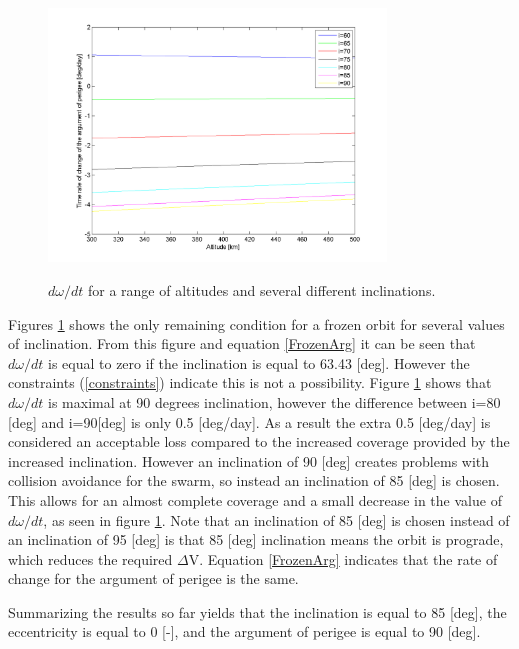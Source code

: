 \begin{figure}
\centering
\includegraphics[width=0.8\textwidth, angle=0]{chapters/img/AltVsOmdot.png}
\label{fig:AltVsOmdot}
\caption{$d\omega/dt$ for a range of altitudes and several different inclinations.}
\end{figure}

Figures \ref{fig:AltVsOmdot} shows the only remaining condition for a frozen orbit for several values of inclination. From this figure and equation \ref{FrozenArg} it can be seen that $d\omega/dt$ is equal to zero if the inclination is equal to 63.43 [deg]. However the constraints (\ref{constraints}) indicate this is not a possibility. Figure \ref{fig:AltVsOmdot} shows that $d\omega/dt$ is maximal at 90 degrees inclination, however the difference between i=80 [deg] and i=90[deg] is only 0.5 [deg/day]. As a result the extra 0.5 [deg/day] is considered an acceptable loss compared to the increased coverage provided by the increased inclination. However an inclination of 90 [deg] creates problems with collision avoidance for the swarm, so instead an inclination of 85 [deg] is chosen. This allows for an almost complete coverage and a small decrease in the value of $d\omega/dt$, as seen in figure \ref{fig:AltVsOmdot}. Note that an inclination of 85 [deg] is chosen instead of an inclination of 95 [deg] is that 85 [deg] inclination means the orbit is prograde, which reduces the required $\Delta$V. Equation \ref{FrozenArg} indicates that the rate of change for the argument of perigee is the same.

Summarizing the results so far yields that the inclination is equal to 85 [deg], the eccentricity is equal to 0 [-], and the argument of perigee is equal to 90 [deg].